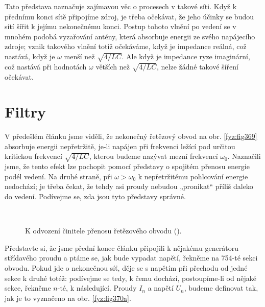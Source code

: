   Tato představa naznačuje zajímavou věc o procesech v takové síti. Když k přednímu konci sítě 
  připojíme zdroj, je třeba očekávat, že jeho účinky se budou sítí šířit k jejímu nekonečnému 
  konci. Postup tohoto vlnění po vedení se v mnohém podobá vyzařování antény, která absorbuje 
  energii ze svého napájecího zdroje; vznik takového vlnění totiž očekáváme, když je impedance 
  reálná, což nastává, když je \(\omega\) menší než \(\sqrt{4/LC}\). Ale když je impedance ryze 
  imaginární, což nastává při hodnotách \(\omega\) větších než \(\sqrt{4/LC}\), nelze žádné takové 
  šíření očekávat.

\section{Filtry}\label{fyz:IIchapXXIIsecVII}
  V předešlém článku jsme viděli, že nekonečný řetězový obvod na obr. \ref{fyz:fig369} absorbuje 
  energii nepřetržitě, je-li napájen při frekvenci ležící pod určitou kritickou frekvencí 
  \(\sqrt{4/LC}\), kterou budeme nazývat mezní frekvencí \(\omega_0\). Naznačili jsme, že tento 
  efekt lze pochopit pomocí představy o spojitém přenosu energie podél vedení. Na druhé straně, při 
  \(\omega>\omega_0\) k nepřetržitému pohlcování energie nedochází; je třeba čekat, že tehdy asi 
  proudy nebudou „pronikat“ příliš daleko do vedení. Podívejme se, zda jsou tyto představy správné.
  
  \begin{figure}[ht!] %
    \centering
     \\
    \caption{K odvození činitele přenosu řetězového obvodu
             (\cite[s.~410]{Feynman02}).}
    \label{fyz:fig370}
  \end{figure}
  
  Představte si, že jsme přední konec článku připojili k nějakému generátoru střídavého proudu a 
  ptáme se, jak bude vypadat napětí, řekněme na \num{754}-té sekci obvodu. Pokud jde o nekonečnou 
  síť, děje se s napětím při přechodu od jedné sekce k druhé totéž: podívejme se tedy, k čemu 
  dochází, postoupíme-li od nějaké sekce, řekněme \(n\)-té, k následující. Proudy \(I_n\) a napětí 
  \(U_n\), budeme definovat tak, jak je to vyznačeno na obr. \ref{fyz:fig370a}.
  
